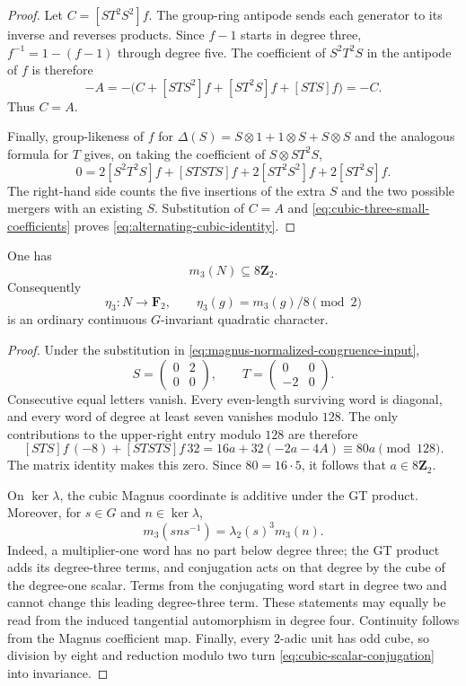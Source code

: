 \begin{proof}
Let $C=[ST^2S^2]f$.  The group-ring antipode sends each generator to
its inverse and reverses products.  Since $f-1$ starts in degree three,
$f^{-1}=1-(f-1)$ through degree five.  The coefficient of $S^2T^2S$
in the antipode of $f$ is therefore
\[
 -A=-\bigl(C+[STS^2]f+[ST^2S]f+[STS]f\bigr)=-C.
\]
Thus $C=A$.

Finally, group-likeness of $f$ for
$\Delta(S)=S\otimes1+1\otimes S+S\otimes S$ and the analogous
formula for $T$ gives, on taking the coefficient of
$S\otimes ST^2S$,
\[
 0=2[S^2T^2S]f+[STSTS]f+2[ST^2S^2]f+2[ST^2S]f.
\]
The right-hand side counts the five insertions of the extra $S$ and
the two possible mergers with an existing $S$.  Substitution of
$C=A$ and \eqref{eq:cubic-three-small-coefficients} proves
\eqref{eq:alternating-cubic-identity}.
\end{proof}

\begin{proposition}
\label{prop:cubic-magnus-eight}
One has
\[
 m_3(N)\subseteq8\mathbf Z_2.
\]
Consequently
\[
 \eta_3:N\longrightarrow\mathbf F_2,
 \qquad \eta_3(g)=m_3(g)/8\pmod2
\]
is an ordinary continuous $G$-invariant quadratic character.
\end{proposition}

\begin{proof}
Under the substitution in
\eqref{eq:magnus-normalized-congruence-input},
\[
 S=\begin{pmatrix}0&2\\0&0\end{pmatrix},\qquad
 T=\begin{pmatrix}0&0\\-2&0\end{pmatrix}.
\]
Consecutive equal letters vanish.  Every even-length surviving word
is diagonal, and every word of degree at least seven vanishes modulo
$128$.  The only contributions to the upper-right entry modulo $128$
are therefore
\[
 [STS]f\,(-8)+[STSTS]f\,32
 =16a+32(-2a-4A)\equiv80a\pmod{128}.
\]
The matrix identity makes this zero.  Since $80=16\cdot5$, it follows
that $a\in8\mathbf Z_2$.

On $\ker\lambda$, the cubic Magnus coordinate is additive under the
GT product.  Moreover, for $s\in G$ and $n\in\ker\lambda$,
\begin{equation}\label{eq:cubic-scalar-conjugation}
 m_3(sns^{-1})=\lambda_2(s)^3m_3(n).
\end{equation}
Indeed, a multiplier-one word has no part below degree three; the
GT product adds its degree-three terms, and conjugation acts on that
degree by the cube of the degree-one scalar.  Terms from the
conjugating word start in degree two and cannot change this leading
degree-three term.  These statements may equally be read from the
induced tangential automorphism in degree four.  Continuity follows
from the Magnus coefficient map.  Finally, every $2$-adic unit has
odd cube, so division by eight and reduction modulo two turn
\eqref{eq:cubic-scalar-conjugation} into invariance.
\end{proof}

